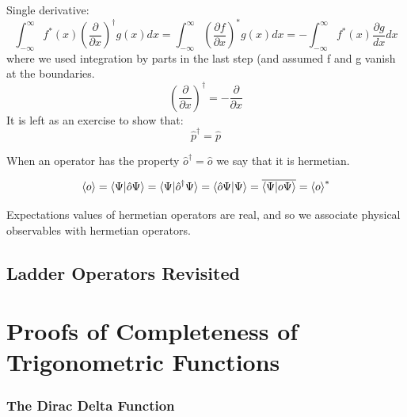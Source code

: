 \documentclass[12pt]{book}
\begin{document}
Single derivative:
\begin{equation*}
\int_{-\infty}^{\infty} f^*(x) \left( \frac{\partial}{\partial x} \right)^\dagger g(x) dx = 
\int_{-\infty}^{\infty} \left(\frac{\partial f}{\partial x}\right)^* g(x) dx = 
-\int_{-\infty}^{\infty} f^*(x) \frac{\partial g}{dx} dx  
\end{equation*}
where we used integration by parts in the last step (and assumed f and g vanish at the boundaries.
\begin{equation}
\left( \frac{\partial}{\partial x} \right)^{\dagger} = -\frac{\partial}{\partial x}
\end{equation}
It is left as an exercise to show that:
\begin{equation}
\hat{p}^\dagger = \hat{p}
\end{equation}

When an operator has the property $\hat{o}^\dagger = \hat{o}$ we say that it is hermetian.  

\begin{equation}
\braket{o} = \braket{\Psi|\hat{o}\Psi} = \braket{\Psi|\hat{o}^\dagger \Psi}
= \braket{\hat{o} \Psi| \Psi} = \overline{\braket{\Psi| o \Psi}} = \braket{o}^*
\end{equation}

Expectations values of hermetian operators are real, and so we associate physical observables with hermetian operators. 







\section{Ladder Operators Revisited}



\appendix






\chapter{Proofs of Completeness of Trigonometric Functions}


\subsection{The Dirac Delta Function}
\end{document}
